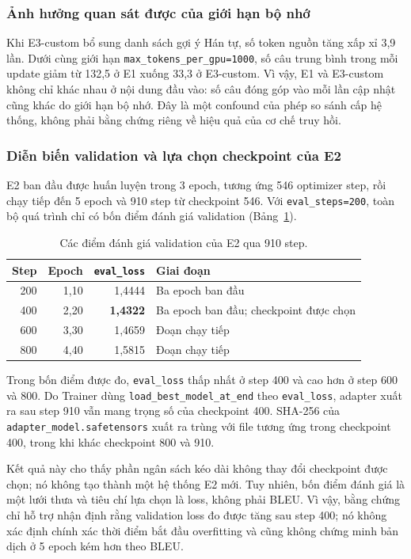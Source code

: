 \subsubsection{Ảnh hưởng quan sát được của giới hạn bộ nhớ}

Khi E3-custom bổ sung danh sách gợi ý Hán tự, số token nguồn tăng xấp xỉ
3,9 lần. Dưới cùng giới hạn \texttt{max\_tokens\_per\_gpu=1000}, số câu trung
bình trong mỗi update giảm từ 132,5 ở E1 xuống 33,3 ở E3-custom. Vì vậy, E1 và
E3-custom không chỉ khác nhau ở nội dung đầu vào: số câu đóng góp vào mỗi lần
cập nhật cũng khác do giới hạn bộ nhớ. Đây là một confound của phép so sánh cấp
hệ thống, không phải bằng chứng riêng về hiệu quả của cơ chế truy hồi.

\subsubsection{Diễn biến validation và lựa chọn checkpoint của E2}
\label{sec:e2-budget}

E2 ban đầu được huấn luyện trong 3 epoch, tương ứng 546 optimizer step, rồi chạy
tiếp đến 5 epoch và 910 step từ checkpoint 546. Với
\texttt{eval\_steps=200}, toàn bộ quá trình chỉ có bốn điểm đánh giá validation
(Bảng~\ref{tab:e2-budget}).

\begin{table}[tbp]
  \centering
  \small
  \renewcommand{\arraystretch}{1.18}
  \caption{Các điểm đánh giá validation của E2 qua 910 step.}
  \label{tab:e2-budget}
  \begin{tabularx}{\textwidth}{@{}rrrX@{}}
    \toprule
    \textbf{Step} & \textbf{Epoch} & \textbf{\texttt{eval\_loss}}
      & \textbf{Giai đoạn} \\
    \midrule
    200 & 1,10 & 1,4444 & Ba epoch ban đầu \\
    400 & 2,20 & \textbf{1,4322} & Ba epoch ban đầu; checkpoint được chọn \\
    600 & 3,30 & 1,4659 & Đoạn chạy tiếp \\
    800 & 4,40 & 1,5815 & Đoạn chạy tiếp \\
    \bottomrule
  \end{tabularx}
\end{table}

Trong bốn điểm được đo, \texttt{eval\_loss} thấp nhất ở step 400 và cao hơn ở
step 600 và 800. Do Trainer dùng \texttt{load\_best\_model\_at\_end} theo
\texttt{eval\_loss}, adapter xuất ra sau step 910 vẫn mang trọng số của
checkpoint 400. SHA-256 của \texttt{adapter\_model.safetensors} xuất ra trùng
với file tương ứng trong checkpoint 400, trong khi khác checkpoint 800 và 910.

Kết quả này cho thấy phần ngân sách kéo dài không thay đổi checkpoint được chọn;
nó không tạo thành một hệ thống E2 mới. Tuy nhiên, bốn điểm đánh giá là một lưới
thưa và tiêu chí lựa chọn là loss, không phải BLEU. Vì vậy, bằng chứng chỉ hỗ trợ
nhận định rằng validation loss đo được tăng sau step 400; nó không xác định
chính xác thời điểm bắt đầu overfitting và cũng không chứng minh bản dịch ở 5
epoch kém hơn theo BLEU.

